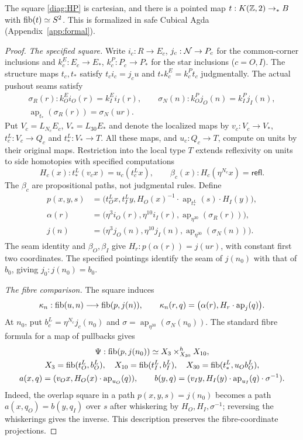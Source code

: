 \begin{theorem}\label{thm:torus}
The square \eqref{diag:HP} is cartesian, and there is a pointed map $t:K(\mathbb Z,2)\to_*B$ with $\operatorname{fib}(t)\simeq S^2$. This is formalized in safe Cubical Agda (Appendix~\ref{app:formal}).
\end{theorem}
\begin{proof}
\emph{The specified square.}
Write $i_c:R\to E_c$, $j_c:\mathcal N\to P_c$ for the common-corner inclusions and $k_c^E:E_c\to E_*$, $k_c^P:P_c\to P_*$ for the star inclusions ($c=O,I$). The structure maps $t_c,t_*$ satisfy $t_ci_c=j_cu$ and $t_*k_c^E=k_c^Pt_c$ judgmentally. The actual pushout seams satisfy
\[
\begin{gathered}
\sigma_R(r):k_O^Ei_O(r)=k_I^Ei_I(r),\qquad
\sigma_N(n):k_O^Pj_O(n)=k_I^Pj_I(n),\\
\operatorname{ap}_{t_*}(\sigma_R(r))=\sigma_N(u r).
\end{gathered}
\]
Put $V_c=L_{N_c}E_c$, $V_*=L_{30}E_*$ and denote the localized maps by $v_c:V_c\to V_*$, $t_c^L:V_c\to Q_c$ and $t_*^L:V_*\to T$. All these maps, and $u_c:Q_c\to T$, compute on units by their original maps. Restriction into the local type $T$ extends reflexivity on units to side homotopies with specified computations
\[
H_c(x):t_*^L(v_cx)=u_c(t_c^Lx),\qquad
\beta_c(x):H_c(\eta^{N_c}x)=\mathsf{refl}.
\]
The $\beta_c$ are propositional paths, not judgmental rules. Define
\[
\begin{aligned}
p(x,y,s)&=\bigl(t_O^Lx,t_I^Ly,
 H_O(x)^{-1}\cdot\operatorname{ap}_{t_*^L}(s)\cdot H_I(y)\bigr),\\
\alpha(r)&=\bigl(\eta^3 i_O(r),\eta^{10}i_I(r),
                    \operatorname{ap}_{\eta^{30}}(\sigma_R(r))\bigr),\\
j(n)&=\bigl(\eta^3 j_O(n),\eta^{10}j_I(n),
                    \operatorname{ap}_{\eta^{30}}(\sigma_N(n))\bigr).
\end{aligned}
\]
The seam identity and $\beta_O,\beta_I$ give $H_r:p(\alpha(r))=j(u r)$, with constant first two coordinates. The specified pointings identify the seam of $j(n_0)$ with that of $b_0$, giving $j_0:j(n_0)=b_0$.

\emph{The fibre comparison.}
The square induces
\[
\kappa_n:\operatorname{fib}(u,n)\longrightarrow\operatorname{fib}(p,j(n)),\qquad
\kappa_n(r,q)=\bigl(\alpha(r),H_r\cdot\operatorname{ap}_j(q)\bigr).
\]
At $n_0$, put $b_c^L=\eta^{N_c}j_c(n_0)$ and $\sigma=\operatorname{ap}_{\eta^{30}}(\sigma_N(n_0))$. The standard fibre formula for a map of pullbacks gives
\[
\begin{gathered}
\Psi:\operatorname{fib}(p,j(n_0))\simeq X_3\mathbin{\times}^{h}_{X_{30}}X_{10},\\
X_3=\operatorname{fib}(t_O^L,b_O^L),\quad X_{10}=\operatorname{fib}(t_I^L,b_I^L),\quad
X_{30}=\operatorname{fib}(t_*^L,u_Ob_O^L),\\
a(x,q)=(v_Ox,H_O(x)\cdot\operatorname{ap}_{u_O}(q)),\qquad
b(y,q)=(v_Iy,H_I(y)\cdot\operatorname{ap}_{u_I}(q)\cdot\sigma^{-1}).
\end{gathered}
\]
Indeed, the overlap square in a path $p(x,y,s)=j(n_0)$ becomes a path $a(x,q_O)=b(y,q_I)$ over $s$ after whiskering by $H_O,H_I,\sigma^{-1}$; reversing the whiskerings gives the inverse. This description preserves the fibre-coordinate projections.


\end{proof}
